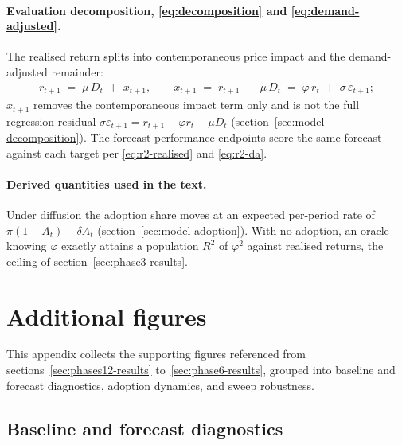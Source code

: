 \documentclass[12pt]{article}
\begin{document}
\paragraph{Evaluation decomposition, \eqref{eq:decomposition} and \eqref{eq:demand-adjusted}.}
The realised return splits into contemporaneous price impact and the demand-adjusted remainder:
\begin{gather*}
  r_{t+1} \;=\; \mu\, D_t \;+\; x_{t+1}, \qquad
  x_{t+1} \;=\; r_{t+1} \;-\; \mu\, D_t \;=\; \varphi\, r_t \;+\; \sigma\, \varepsilon_{t+1};
\end{gather*}
$x_{t+1}$ removes the contemporaneous impact term only and is not the full regression residual $\sigma\varepsilon_{t+1} = r_{t+1} - \varphi r_t - \mu D_t$ (section~\ref{sec:model-decomposition}). The forecast-performance endpoints score the same forecast against each target per \eqref{eq:r2-realised} and \eqref{eq:r2-da}.

\paragraph{Derived quantities used in the text.}
Under diffusion the adoption share moves at an expected per-period rate of $\pi(1 - A_t) - \delta A_t$ (section~\ref{sec:model-adoption}). With no adoption, an oracle knowing $\varphi$ exactly attains a population $R^{2}$ of $\varphi^{2}$ against realised returns, the ceiling of section~\ref{sec:phase3-results}.

\section{Additional figures}\label{app:figures}

This appendix collects the supporting figures referenced from sections~\ref{sec:phases12-results} to~\ref{sec:phase6-results}, grouped into baseline and forecast diagnostics, adoption dynamics, and sweep robustness.

\subsection{Baseline and forecast diagnostics}
\end{document}
